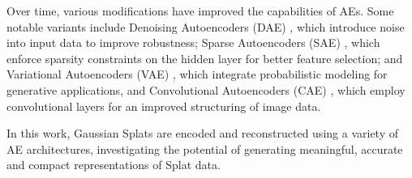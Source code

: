 Over time, various modifications have improved the capabilities of AEs. Some notable variants include Denoising Autoencoders (DAE) \cite{Vincent2008ExtractingAC}, which introduce noise into input data to improve robustness; Sparse Autoencoders (SAE) \cite{ranzato2006efficient}, which enforce sparsity constraints on the hidden layer for better feature selection; and Variational Autoencoders (VAE) \cite{Kingma2014SemisupervisedLW}, which integrate probabilistic modeling for generative applications, and Convolutional Autoencoders (CAE) \cite{masci2011stacked}, which employ convolutional layers for an improved structuring of image data.

In this work, Gaussian Splats are encoded and reconstructed using a variety of AE architectures, investigating the potential of generating meaningful, accurate and compact representations of Splat data.